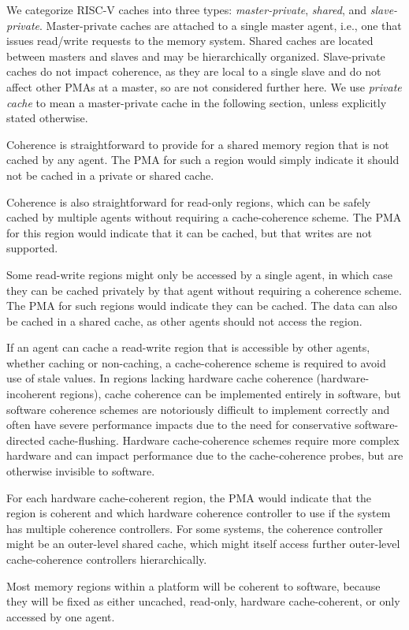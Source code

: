 \begin{commentary}
We categorize RISC-V caches into three types: {\em master-private},
{\em shared}, and {\em slave-private}.  Master-private caches are
attached to a single master agent, i.e., one that issues read/write
requests to the memory system.  Shared caches are located between
masters and slaves and may be hierarchically organized.  Slave-private
caches do not impact coherence, as they are local to a single slave
and do not affect other PMAs at a master, so are not considered
further here.  We use {\em private cache} to mean a master-private
cache in the following section, unless explicitly stated otherwise.

Coherence is straightforward to provide for a shared memory region
that is not cached by any agent.  The PMA for such a region would
simply indicate it should not be cached in a private or shared cache.

Coherence is also straightforward for read-only regions, which can be
safely cached by multiple agents without requiring a cache-coherence
scheme.  The PMA for this region would indicate that it can be cached,
but that writes are not supported.

Some read-write regions might only be accessed by a single agent, in
which case they can be cached privately by that agent without
requiring a coherence scheme.  The PMA for such regions would indicate
they can be cached.  The data can also be cached in a shared cache, as
other agents should not access the region.

If an agent can cache a read-write region that is accessible by other
agents, whether caching or non-caching, a cache-coherence scheme is
required to avoid use of stale values.  In regions lacking hardware
cache coherence (hardware-incoherent regions), cache coherence can be
implemented entirely in software, but software coherence schemes are
notoriously difficult to implement correctly and often have severe
performance impacts due to the need for conservative software-directed
cache-flushing.  Hardware cache-coherence schemes require more complex
hardware and can impact performance due to the cache-coherence probes,
but are otherwise invisible to software.

For each hardware cache-coherent region, the PMA would indicate that
the region is coherent and which hardware coherence controller to use
if the system has multiple coherence controllers.  For some systems,
the coherence controller might be an outer-level shared cache, which
might itself access further outer-level cache-coherence controllers
hierarchically.

Most memory regions within a platform will be coherent to software,
because they will be fixed as either uncached, read-only, hardware
cache-coherent, or only accessed by one agent.
\end{commentary}

